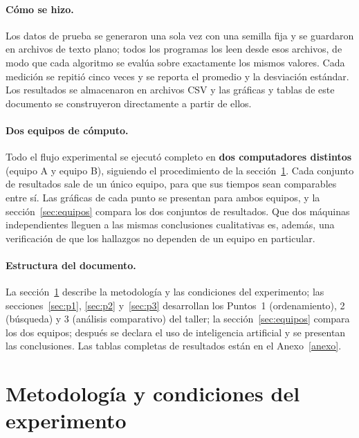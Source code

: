 \documentclass[11pt,a4paper]{article}
\begin{document}
\paragraph{C\'omo se hizo.} Los datos de prueba se generaron una sola vez con una semilla fija y se guardaron
en archivos de texto plano; todos los programas los leen desde esos archivos, de modo que cada algoritmo se
eval\'ua sobre exactamente los mismos valores. Cada medici\'on se repiti\'o cinco veces y se reporta el promedio
y la desviaci\'on est\'andar. Los resultados se almacenaron en archivos CSV y las gr\'aficas y tablas de este
documento se construyeron directamente a partir de ellos.

\paragraph{Dos equipos de c\'omputo.} Todo el flujo experimental se ejecut\'o completo en \textbf{dos
computadores distintos} (equipo A y equipo B), siguiendo el procedimiento de la secci\'on~\ref{sec:metodologia}.
Cada conjunto de resultados sale de un \'unico equipo, para que sus tiempos sean comparables entre s\'i. Las gr\'aficas de cada punto se presentan para ambos
equipos, y la secci\'on~\ref{sec:equipos} compara los dos conjuntos de resultados. Que dos m\'aquinas
independientes lleguen a las mismas conclusiones cualitativas es, adem\'as, una verificaci\'on de que los
hallazgos no dependen de un equipo en particular.

\paragraph{Estructura del documento.} La secci\'on~\ref{sec:metodologia} describe la metodolog\'ia y las
condiciones del experimento; las secciones~\ref{sec:p1}, \ref{sec:p2} y~\ref{sec:p3} desarrollan los Puntos~1
(ordenamiento), 2 (b\'usqueda) y 3 (an\'alisis comparativo) del taller; la secci\'on~\ref{sec:equipos} compara
los dos equipos; despu\'es se declara el uso de inteligencia artificial y se presentan las conclusiones. Las
tablas completas de resultados est\'an en el Anexo~\ref{anexo}.

\section{Metodolog\'ia y condiciones del experimento}\label{sec:metodologia}
\end{document}
